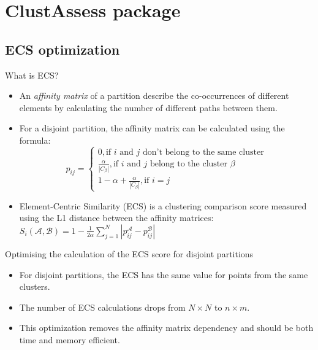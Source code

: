 \section{ClustAssess package}

\subsection{ECS optimization}

\begin{frame}[label=ecs-first]{What is ECS?}
    \begin{itemize}[<+->]
        \item An \textit{affinity matrix} of a partition describe the co-occurrences of different elements by calculating the number of different paths between them.
        \item  For a disjoint partition, the affinity matrix can be calculated using the formula: \begin{equation*} \label{eq:affinity-disjoin}
                  p_{ij} =
                  \begin{cases}
                      0, \text{if } i \text{ and } j \text{ don't belong to the same cluster}                  \\
                      \frac{\alpha}{|C_\beta|}, \text{if }i\text{ and } j \text{ belong to the cluster } \beta \\
                      1 - \alpha + \frac{\alpha}{|C_\beta|}, \text{if } i = j
                  \end{cases}
              \end{equation*}
        \item Element-Centric Similarity (ECS) \cite{Gates2019} is a clustering comparison score measured using the L1 distance between the affinity matrices: $ \displaystyle S_i (\mathcal{A}, \mathcal{B}) = 1 - \frac{1}{2 \alpha} \sum_{j = 1}^N |p_{ij}^{\mathcal{A}} - p_{ij}^{\mathcal{B}}|$
    \end{itemize}

    \hyperlink{app1}{}

\end{frame}

\begin{frame}{Optimising the calculation of the ECS score for disjoint partitions}
    \begin{itemize}
        \item For disjoint partitions, the ECS has the same value for points from the same clusters.
        \item The number of ECS calculations drops from $N \times N$ to $n \times m$.
        \item This optimization removes the affinity matrix dependency and should be both time and memory efficient.

    \end{itemize}
\end{frame}


